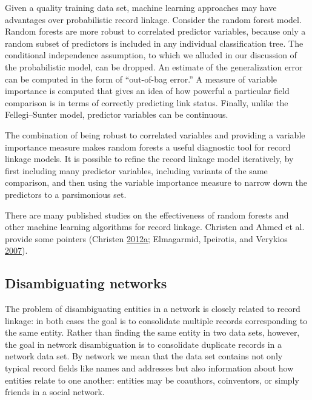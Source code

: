 \documentclass[]{krantz}
\begin{document}
\enlargethispage{12pt} Given a quality training data set, machine
learning approaches may have advantages over probabilistic record
linkage. Consider the random forest model. Random forests are more
robust to correlated predictor variables, because only a random subset
of predictors is included in any individual classification tree. The
conditional independence assumption, to which we alluded in our
discussion of the probabilistic model, can be dropped. An estimate of
the generalization error can be computed in the form of ``out-of-bag
error.'' A measure of variable importance is computed that gives an idea
of how powerful a particular field comparison is in terms of correctly
predicting link status. Finally, unlike the Fellegi--Sunter model,
predictor variables can be continuous.

The combination of being robust to correlated variables and providing a
variable importance measure makes random forests a useful diagnostic
tool for record linkage models. It is possible to refine the record
linkage model iteratively, by first including many predictor variables,
including variants of the same comparison, and then using the variable
importance measure to narrow down the predictors to a parsimonious set.

There are many published studies on the effectiveness of random forests
and other machine learning algorithms for record linkage. Christen and
Ahmed et al. provide some pointers (Christen
\protect\hyperlink{ref-christen2012survey}{2012}\protect\hyperlink{ref-christen2012survey}{a};
Elmagarmid, Ipeirotis, and Verykios
\protect\hyperlink{ref-elmagarmid2007duplicate}{2007}).

\vspace*{-3pt}

\subsection{Disambiguating networks}\label{disambiguating-networks}

\enlargethispage{18pt} The problem of disambiguating entities in a
network is closely related to record linkage: in both cases the goal is
to consolidate multiple records corresponding to the same entity. Rather
than finding the same entity in two data sets, however, the goal in
network disambiguation is to consolidate duplicate records in a network
data set. By network we mean that the data set contains not only typical
record fields like names and addresses but also information about how
entities relate to one another: entities may be coauthors, coinventors,
or simply friends in a social network.
\end{document}
